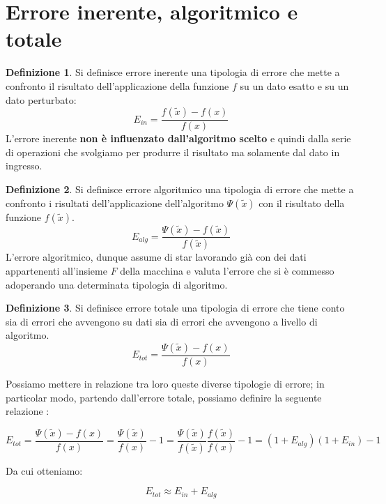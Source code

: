 \documentclass[12pt, a4paper]{book}
\theoremstyle{definition}
\newtheorem{defn}{Definizione}[section]
\begin{document}
\section{Errore inerente, algoritmico e totale}
\begin{flushleft}

\begin{defn}
Si definisce errore inerente una tipologia di errore che mette a confronto il risultato dell'applicazione della funzione $f$ su un dato esatto e su un dato perturbato:
\[
	E_{in} = \frac{f(\tilde{x}) - f(x)}{f(x)}
\] 
L'errore inerente \textbf{non è influenzato dall'algoritmo scelto} e quindi dalla serie di operazioni che svolgiamo per produrre il risultato ma solamente dal dato in ingresso.
\end{defn}

\begin{defn}
Si definisce errore algoritmico una tipologia di errore che mette a confronto i risultati dell'applicazione dell'algoritmo $\Psi(\tilde{x})$ con il risultato della funzione $f(\tilde{x})$.
\[
	E_{alg} = \frac{\Psi(\tilde{x}) - f(\tilde{x})}{f(\tilde{x})}
\] 
L'errore algoritmico, dunque assume di star lavorando già con dei dati appartenenti all'insieme $F$ della macchina e valuta l'errore che si è commesso adoperando una determinata tipologia di algoritmo. 
\end{defn}

\begin{defn}
Si definisce errore totale una tipologia di errore che tiene conto sia di errori che avvengono su dati sia di errori che avvengono a livello di algoritmo.
\[
	E_{tot} = \frac{\Psi(\tilde{x}) - f(x)}{f(x)}
\] 
\end{defn}

Possiamo mettere in relazione tra loro queste diverse tipologie di errore; in particolar modo, partendo dall'errore totale, possiamo definire la seguente relazione : 

\[
		E_{tot} = \frac{\Psi(\tilde{x}) - f(x)}{f(x)} = \frac{\Psi(\tilde{x})}{f(x)} - 1  =  \frac{\Psi(\tilde{x})}{f(\tilde{x})} \frac{f(\tilde{x})}{f(x)} - 1 = (1+E_{alg})(1+E_{in}) -1
\]

Da cui otteniamo: 

\[
		E_{tot} \approx E_{in} +  E_{alg}
\]


\end{flushleft}
\end{document}
